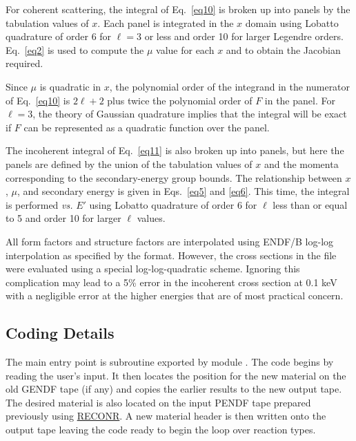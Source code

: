 For coherent scattering, the integral of Eq.~\ref{eq10} is broken up
into panels  by the tabulation values of $x$.  Each panel is integrated
in the $x$ domain using Lobatto quadrature of order 6 for $\ell=3$
or less and order 10 for larger Legendre orders.  Eq.~\ref{eq2}
is used to compute the $\mu$ value for each $x$ and to obtain the
Jacobian required.

Since $\mu$ is quadratic in $x$, the polynomial order of the integrand
in the numerator of Eq.~\ref{eq10} is $2\ell+2$ plus twice the polynomial
order of $F$ in the panel.  For $\ell=3$, the theory of Gaussian quadrature
implies that the integral will be exact if $F$ can be represented as a
quadratic function over the panel.

The incoherent integral of Eq.~\ref{eq11} is also broken up into panels,
but here the panels are defined by the union of the tabulation values
of $x$ and the momenta corresponding to the secondary-energy group
bounds.  The relationship between $x$, $\mu$, and secondary energy is given
in Eqs.~\ref{eq5} and \ref{eq6}.  This time, the integral is
performed {\it vs.} $E'$ using Lobatto quadrature
of order 6 for $\ell$ less than or equal to 5 and order 10 for
larger $\ell$ values.

All form factors and structure factors are interpolated using
ENDF/B log-log interpolation as specified by the format.  However, the
cross sections in the file were evaluated using a special
log-log-quadratic scheme.  Ignoring this complication may lead to a 5\%
error in the incoherent cross section at 0.1 keV with a negligible
error at the higher energies that are of most practical
concern\cite{Hubbell}.

\subsection{Coding Details}
\label{ssGAMINR_details}

The main entry point is subroutine  exported by
module .
The code begins by reading the user's input.  It then locates the
position for the new material on the old GENDF
tape (if any) and copies the earlier results to the new output
tape.  The desired material is also located on the input
PENDF tape prepared previously using
\hyperlink{sRECONRhy}{RECONR}.
A new material header is then written onto the output tape leaving
the code ready to begin the loop over reaction types.

